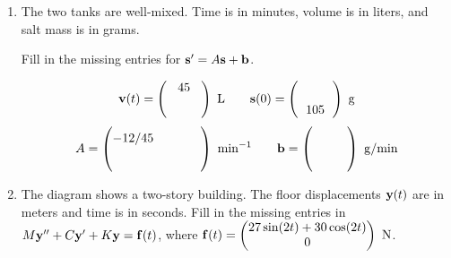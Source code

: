 \documentclass[11pt,letterpaper]{article}
\newcommand{\matrixentry}{\makebox[0.38in]{}\rule[-0.08in]{0pt}{0.25in}}
\newenvironment{answerarea}{%
  \par\noindent\begin{lrbox}{\AnswerAreaBox}\begin{minipage}{\dimexpr\linewidth-2\fboxsep-2\fboxrule\relax}%
  \setlength{\abovedisplayskip}{4pt}\setlength{\belowdisplayskip}{4pt}%
  \setlength{\abovedisplayshortskip}{4pt}\setlength{\belowdisplayshortskip}{4pt}%
}{%
  \end{minipage}\end{lrbox}\fbox{\usebox{\AnswerAreaBox}}\par
}
\begin{document}
\begin{enumerate}
\item The two tanks are well-mixed. Time is in minutes, volume is in liters,
and salt mass is in grams.

\noindent{}

Fill in the missing entries for $\mathbf{s}'=A\mathbf{s}+\mathbf{b}$.
\begin{answerarea}
\[
\vect{v}(t)=\begin{pmatrix}45\\\matrixentry\end{pmatrix}\ \mathrm{L}
\qquad
\vect{s}(0)=\begin{pmatrix}\matrixentry\\105\end{pmatrix}\ \mathrm{g}
\]
\[
A=\begin{pmatrix}-12/45&\matrixentry\\\matrixentry&\matrixentry\end{pmatrix}
  \ \mathrm{min}^{-1}
\qquad
\vect{b}=\begin{pmatrix}\matrixentry\\\matrixentry\end{pmatrix}\ \mathrm{g/min}
\]

\end{answerarea}
\vfill
\item The diagram shows a two-story building. The floor displacements
$\mathbf{y}(t)$ are in meters and time is in seconds. Fill in the missing
entries in $M\mathbf{y}''+C\mathbf{y}'+K\mathbf{y}=\mathbf{f}(t)$, where
$\vect{f}(t)=\begin{pmatrix}27\sin(2t)+30\cos(2t)\\0\end{pmatrix}\ \mathrm{N}$.


\end{enumerate}
\end{document}
